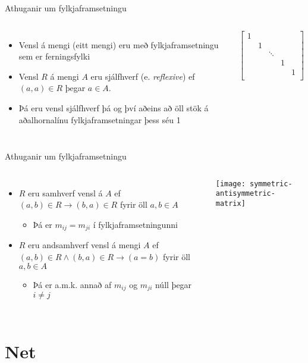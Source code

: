 \documentclass{beamer}
\begin{document}
\begin{frame}{Athuganir um fylkjaframsetningu}
\begin{columns}
\begin{itemize}
 \item Vensl á mengi (eitt mengi) eru með fylkjaframsetningu sem er ferningsfylki
 \item Vensl $R$ á mengi $A$ eru sjálfhverf (e. \emph{reflexive}) ef $(a, a) \in R$ þegar $a \in A$.
 \item Þá eru vensl sjálfhverf þá og því aðeins að öll stök á aðalhornalínu fylkjaframsetningar þess séu 1
\end{itemize}
\[
\begin{bmatrix}
1&&&&\\
&1&&&\\
&&\ddots&&\\
&&&1&\\
&&&&1\\
\end{bmatrix}
\]
\end{columns}
\end{frame}

\begin{frame}{Athuganir um fylkjaframsetningu}
\begin{columns}
\begin{itemize}
 \item $R$ eru samhverf vensl á $A$ ef $(a,b) \in R \to (b, a) \in R$ fyrir öll $a, b \in A$
 \begin{itemize}
  \item Þá er $m_{ij} = m_{ji}$ í fylkjaframsetningunni
 \end{itemize}
 \item $R$ eru andsamhverf vensl á mengi $A$ ef $(a, b) \in R \land (b, a) \in R \to (a = b)$ fyrir öll $a, b \in A$
 \begin{itemize}
  \item Þá er a.m.k. annað af $m_{ij}$ og $m_{ji}$ núll þegar $i\neq j$ 
 \end{itemize}

\end{itemize}
\texttt{[image: symmetric-antisymmetric-matrix]}
\end{columns}
\end{frame}

\section{Net}
\end{document}
